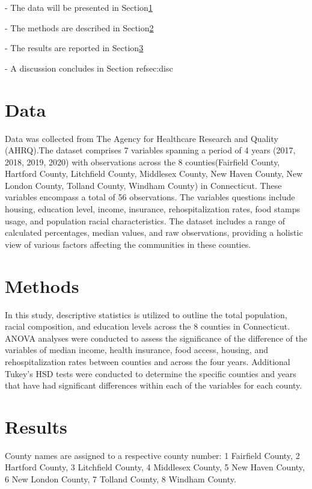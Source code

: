 \documentclass[12pt]{article}
\begin{document}
- The data will be presented in Section\ref{sec:data}

- The methods are described in Section\ref{sec:meth}

- The results are reported in Section\ref{sec:resu}

- A discussion concludes in Section ref{sec:disc}

\section{Data}\label{sec:data}

Data was collected from The Agency for Healthcare Research and Quality (AHRQ).The dataset comprises 7 variables 
spanning a period of 4 years (2017, 2018, 2019, 2020) with observations across the 8 counties(Fairfield County, Hartford County, 
Litchfield County, Middlesex County, New Haven County, New London County, Tolland County, Windham County) in Connecticut. These variables 
encompass a total of 56 observations. The variables questions include housing, education level, income, insurance,
rehospitalization rates, food stamps usage, and population racial characteristics. The dataset includes a range of 
calculated percentages, median values, and raw observations, providing a holistic view of various factors affecting 
the communities in these counties. 

\section{Methods}\label{sec:meth}

In this study, descriptive statistics is utilized to outline the total population, racial composition, 
and education levels across the 8 counties in Connecticut. ANOVA analyses were 
conducted to assess the significance of the difference of the variables of median income, health insurance, food access, housing, and rehospitalization rates between counties and across the four years. Additional 
Tukey's HSD tests were conducted to determine the specific counties and years that have had significant differences within 
each of the variables for each county.

\section{Results}\label{sec:resu}

County names are assigned to a respective county number: 
1	Fairfield County,
2	Hartford County,
3	Litchfield County,
4	Middlesex County,
5	New Haven County,
6	New London County,
7	Tolland County,
8	Windham County.
\end{document}
